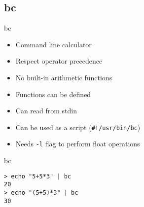 \subsection{bc}

\begin{frame}[fragile]{bc}
  \begin{itemize}
    \pause \item Command line calculator
    \pause \item Respect operator precedence
    \pause \item No built-in arithmetic functions
    \pause \item Functions can be defined
    \pause \item Can read from stdin
    \pause \item Can be used as a script (\texttt{\#!/usr/bin/bc})
    \pause \item Needs \texttt{-l} flag to perform float operations
  \end{itemize}
\end{frame}
  

\begin{frame}[fragile]{bc}
  \begin{exampleblock}{}
    \begin{lstlisting}[showstringspaces=false]
> echo "5+5*3" | bc
20
> echo "(5+5)*3" | bc
30
    \end{lstlisting}
  \end{exampleblock}
\end{frame}
